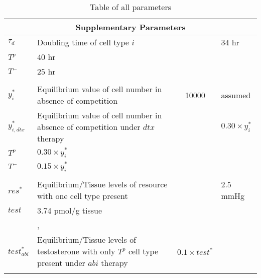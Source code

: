 \begin{longtable}[c]{|l|p{4.3cm}|c|p{2.3cm}|}
  \multicolumn{4}{|c|}{Supplementary Parameters}\\ \hline
  $\tau_d$  & Doubling time of cell type $i$ &
  \begin{tabular}{l|l}
    $T^+$ & $34$ \tiny{hr} \\
    $T^p$ & $40$ \tiny{hr} \\
    $T^-$ & $25$ \tiny{hr} \\
  \end{tabular}
  & \cite{atcc} \\ \hline
  $y_i^*$ & Equilibrium value of cell number in absence of competition & 10000 & assumed \\ \hline
  $y_{i,dtx}^*$ & Equilibrium value of cell number in absence of competition under $dtx$ therapy &
  \begin{tabular}{l|l}
    $T^+$ & $0.30 \times y_i^*$ \\
    $T^p$ & $0.30 \times y_i^*$ \\
    $T^-$ & $0.15 \times y_i^*$ \\
  \end{tabular}
  & \cite{Morikawa} \\ \hline
  $res^*$ & Equilibrium/Tissue levels of resource with one cell type present &
  \begin{tabular}{l|l}
    $O_2$    & 2.5 \tiny{mmHg}          \\
    $test$   & 3.74 \tiny{pmol/g tissue}\\
  \end{tabular}
  & \cite{Steward},\cite{Titus} \\ \hline
  $test_{abi}^*$ & Equilibrium/Tissue levels of testosterone with only $T^p$ cell type present under $abi$ therapy & $0.1 \times test^*$ & \cite{Acharya} \\ \hline

  \caption{Table of all parameters}
  \label{parmtable}\\
\end{longtable}
